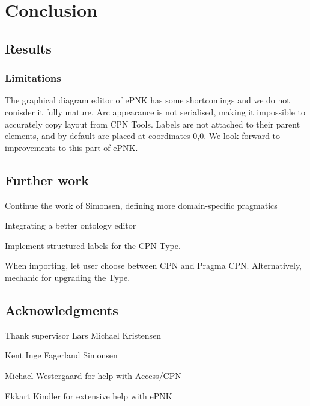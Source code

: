 \chapter{Conclusion}
\label{chap:conclusion}


\section{Results}

\subsection{Limitations}

The graphical diagram editor of ePNK has some shortcomings and we do not
conisder it fully mature. Arc appearance is not serialised, making it impossible
to accurately copy layout from CPN Tools. Labels are not attached to their
parent elements, and by default are placed at coordinates 0,0. We look forward
to improvements to this part of ePNK.

\section{Further work}

Continue the work of Simonsen, defining more domain-specific pragmatics

Integrating a better ontology editor

Implement structured labels for the CPN Type.

When importing, let user choose between CPN and Pragma CPN. Alternatively,
mechanic for upgrading the Type.

\section{Acknowledgments}

Thank supervisor Lars Michael Kristensen

Kent Inge Fagerland Simonsen

Michael Westergaard for help with Access/CPN

Ekkart Kindler for extensive help with ePNK